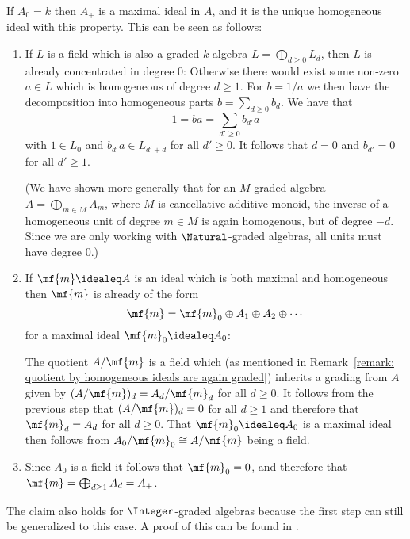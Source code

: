 \begin{remark}
  If $A_0 = k$ then $A_+$ is a maximal ideal in $A$, and it is the unique homogeneous ideal with this property.
  This can be seen as follows:
  \begin{enumerate}[label=\arabic*)]
    \item
      If $L$ is a field which is also a graded $k$-algebra $L = \bigoplus_{d \geq 0} L_d$, then $L$ is already concentrated in degree $0$:
      Otherwise there would exist some non-zero $a \in L$ which is homogeneous of degree $d \geq 1$.
      For $b = 1/a$ we then have the decomposition into homogeneous parts $b = \sum_{d \geq 0} b_d$.
      We have that
      \[
          1
        = b a
        = \sum_{d' \geq 0} b_{d'} a
      \]
      with $1 \in L_0$ and $b_{d'} a \in L_{d' + d}$ for all $d' \geq 0$.
      It follows that $d = 0$ and $b_{d'} = 0$ for all $d' \geq 1$.
      
      (We have shown more generally that for an $M$-graded algebra $A = \bigoplus_{m \in M} A_m$, where $M$ is cancellative additive monoid, the inverse of a homogeneous unit of degree $m \in M$ is again homogenous, but of degree $-d$.
      Since we are only working with $\Natural$-graded algebras, all units must have degree $0$.)
    \item
      If $\mf{m} \idealeq A$ is an ideal which is both maximal and homogeneous then $\mf{m}$ is already of the form
      \[
          \mf{m}
        = \mf{m}_0 \oplus A_1 \oplus A_2 \oplus \dotsb
      \]
      for a maximal ideal $\mf{m}_0 \idealeq A_0$:
      
      The quotient $A/\mf{m}$ is a field which (as mentioned in Remark~\ref{remark: quotient by homogeneous ideals are again graded}) inherits a grading from $A$ given by $(A/\mf{m})_d = A_d / \mf{m}_d$ for all $d \geq 0$.
      It follows from the previous step that $(A/\mf{m})_d = 0$ for all $d \geq 1$ and therefore that $\mf{m}_d = A_d$ for all $d \geq 0$.
      That $\mf{m}_0 \idealeq A_0$ is a maximal ideal then follows from $A_0/\mf{m}_0 \cong A/\mf{m}$ being a field.
    \item
      Since $A_0$ is a field it follows that $\mf{m}_0 = 0$, and therefore that $\mf{m} = \bigoplus_{d \geq 1} A_d = A_+$.
  \end{enumerate}
  The claim also holds for $\Integer$-graded algebras because the first step can still be generalized to this case.
  A proof of this can be found in \cite[Remark 1.3.10]{GradedRings2004}.
\end{remark}



